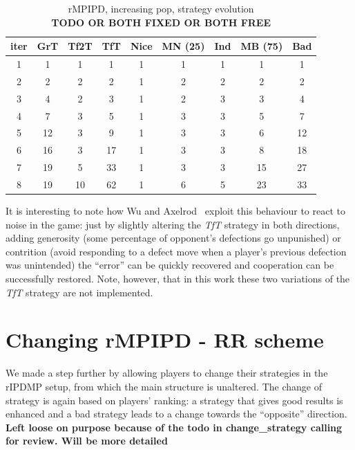 \documentclass[journal,a4paper,10pt,twoside]{IEEEtran} %
\begin{document}
\begin{table}[ht]
    \caption{rMPIPD, increasing pop, strategy evolution\\ \textbf{TODO OR BOTH FIXED OR BOTH FREE}}
    \label{tab:ripdmp-const}
    \centering
    \begin{tabular}{c|cccccccc} \toprule
        iter & GrT & Tf2T & TfT & Nice & MN (25) & Ind & MB (75) & Bad \\ \midrule
        1 &   1 &   1 &   1 &  1 &  1 &  1 &   1 &   1 \\
        2 &   2 &   2 &   2 &  1 &  2 &  2 &   2 &   2 \\
        3 &   4 &   2 &   3 &  1 &  2 &  3 &   3 &   4 \\
        4 &   7 &   3 &   5 &  1 &  3 &  3 &   5 &   7 \\
        5 &  12 &   3 &   9 &  1 &  3 &  3 &   6 &  12 \\
        6 &  16 &   3 &  17 &  1 &  3 &  3 &   8 &  18 \\
        7 &  19 &   5 &  33 &  1 &  3 &  3 &  15 &  27 \\
        8 &  19 &  10 &  62 &  1 &  6 &  5 &  23 &  33 \\ \bottomrule
    \end{tabular}
\end{table}

It is interesting to note how Wu and Axelrod~\cite{IPDnoise} exploit this behaviour to react to noise in the game: just by slightly altering the \textit{TfT} strategy in both directions, adding generosity (some percentage of opponent's defections go unpunished) or contrition (avoid responding to a defect move when a player's previous defection was unintended) the ``error'' can be quickly recovered and cooperation can be successfully restored. Note, however, that in this work these two variations of the \textit{TfT} strategy are not implemented.

\section{Changing rMPIPD - RR scheme} \label{s:crIPDMP}
We made a step further by allowing players to change their strategies in the rIPDMP setup, from which the main structure is unaltered. The change of strategy is again based on players' ranking: a strategy that gives good results is enhanced and a bad strategy leads to a change towards the ``opposite'' direction.
\textbf{Left loose on purpose because of the todo in change_strategy calling for review. Will be more detailed}
\end{document}
